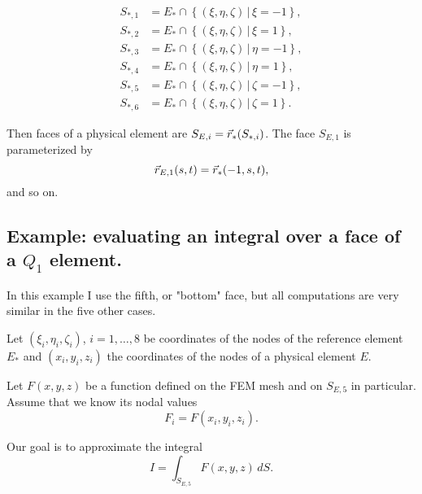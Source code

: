 \documentclass[11pt]{article}
\begin{document}
\begin{equation}
\label{eq:7}
\begin{aligned}
S_{*,1} &=  E_{*} \cap \left \{ (\xi, \eta, \zeta)\, |\, \xi = -1 \right \},\\
S_{*,2} &=  E_{*} \cap \left \{ (\xi, \eta, \zeta)\, |\, \xi = 1  \right \},\\
S_{*,3} &=  E_{*} \cap \left \{ (\xi, \eta, \zeta)\, |\, \eta = -1 \right \},\\
S_{*,4} &=  E_{*} \cap \left \{ (\xi, \eta, \zeta)\, |\, \eta = 1  \right \},\\
S_{*,5} &=  E_{*} \cap \left \{ (\xi, \eta, \zeta)\, |\, \zeta = -1 \right \},\\
S_{*,6} &=  E_{*} \cap \left \{ (\xi, \eta, \zeta)\, |\, \zeta = 1  \right \}.
\end{aligned}
\end{equation}

Then faces of a physical element are $S_{E,i} = \vec r_{*}(S_{*,i})$.
The face $S_{E,1}$ is parameterized by
\begin{equation*}
\label{eq:8}
\vec r_{E,1}(s, t) = \vec r_{*}(-1,s,t),
\end{equation*}
and so on.

\subsection{Example: evaluating an integral over a face of a $Q_{1}$ element.}
\label{sec-4-1}

\newcommand{\face}{S_{E,5}}

In this example I use the fifth, or "bottom" face, but all
computations are very similar in the five other cases.

Let $(\xi_{i}, \eta_{i}, \zeta_{i})$, $i = 1,\dots,8$ be coordinates
of the nodes of the reference element $E_{*}$ and $(x_{i}, y_{i},
z_{i})$ the coordinates of the nodes of a physical element $E$.

Let $F(x,y,z)$ be a function defined on the FEM mesh and on $\face$
in particular. Assume that we know its nodal values
\begin{equation*}
F_{i} = F(x_{i}, y_{i}, z_{i}).
\end{equation*}

Our goal is to approximate the integral
\begin{equation}
\label{eq:13}
I = \int_{\face} F(x,y,z)\, dS.
\end{equation}
\end{document}
